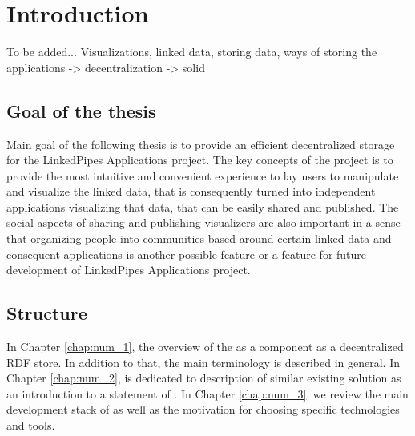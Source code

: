 \chapter*{Introduction}

To be added... 
Visualizations, linked data, storing data, ways of storing the applications -> decentralization -> solid

\section*{Goal of the thesis}
Main goal of the following thesis is to provide an efficient decentralized storage for the LinkedPipes Applications project. The key concepts of the project is to provide the most intuitive and convenient experience to lay users to manipulate and visualize the linked data, that is consequently turned into independent applications visualizing that data, that can be easily shared and published. The social aspects of sharing and publishing visualizers are also important in a sense that organizing people into communities based around certain linked data and consequent applications is another possible feature or a feature for future development of LinkedPipes Applications project. 

\section*{Structure}

In Chapter \ref{chap:num_1}, the overview of the \lpa{} as a component as a decentralized RDF store. In addition to that, the main terminology is described in general. In Chapter \ref{chap:num_2}, is dedicated to description of similar existing solution as an introduction to a statement of \lpa{}. In Chapter \ref{chap:num_3}, we review the main development stack of \lpa{} as well as the motivation for choosing specific technologies and tools.